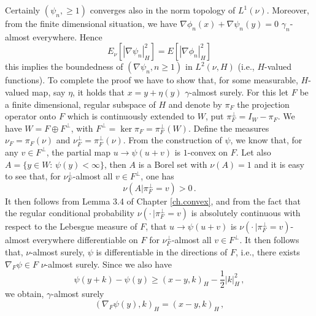 \documentclass[12pt,a4paper]{book}
\newcommand{\beaa}{\begin{eqnarray*}}
\newcommand{\eeaa}{\end{eqnarray*}}
\newcommand{\ga}{\gamma}
\begin{document}
Certainly  $(\psi_n,\geq 1)$
converges also in the norm topology of $L^1(\nu)$.
Moreover, from the finite dimensional situation, we have
$\nabla\phi_n(x)+\nabla\psi_n(y)=0$ $\ga_n$-almost everywhere. Hence
$$
E_\nu[|\nabla\psi_n|_H^2]=E[|\nabla\phi_n|_H^2]
$$
this implies the
boundedness of $(\nabla\psi_n,n\geq 1)$ in $L^2(\nu,H)$ (i.e.,
$H$-valued functions). %
To complete the proof
we have to show that, for some measurable, $H$-valued map, say
$\eta$, it holds that 
$x=y+\eta(y)$ $\ga$-almost surely. For this let 
$F$ be a finite dimensional, regular subspace of $H$ and denote by
$\pi_F$ the projection operator onto $F$ which is continuously
extended to $W$, put $\pi_F^\bot=I_W-\pi_F$. We have
$W=F\oplus F^\bot$, with $F^\bot=\ker \pi_F=\pi_F^\bot(W)$. Define the
measures $\nu_F=\pi_F(\nu)$ and $\nu_F^\bot=\pi_F^\bot(\nu)$. From the
construction of $\psi$, we know that, for 
any $v\in F^\bot$, the partial map $u\to \psi(u+v)$ is $1$-convex on
$F$. Let also $A=\{y\in W:\,\psi(y)<\infty\}$, then $A$ is a Borel set
with $\nu(A)=1$ and it is easy to see that, for  $\nu_F^\bot$-almost all
$v\in F^\bot$, one has 
$$
\nu(A|\pi_F^\bot=v)>0\,.
$$
It then follows from Lemma 3.4 of Chapter \ref{ch.convex}, and from the fact that
the regular conditional probability $\nu(\cdot\,|\pi_F^\bot=v)$ is
absolutely continuous with respect to the Lebesgue measure of $F$,
that $u\to \psi(u+v)$ is $\nu(\cdot\,|\pi_F^\bot=v)$-almost everywhere
differentiable on $F$ for $\nu_F^\bot$-almost
all $v\in F^\bot$. It then follows that, $\nu$-almost surely,  $\psi$
is differentiable in the directions of $F$, i.e., there exists
$\nabla_F\psi\in F$ $\nu$-almost surely. Since we also have 
$$
\psi(y+k)-\psi(y)\geq (x-y,k)_H-\frac{1}{2}|k|_H^2\,,
$$
we obtain, $\ga$-almost surely
$$
(\nabla_F\psi(y),k)_H=(x-y,k)_H\,,
$$
\end{document}
